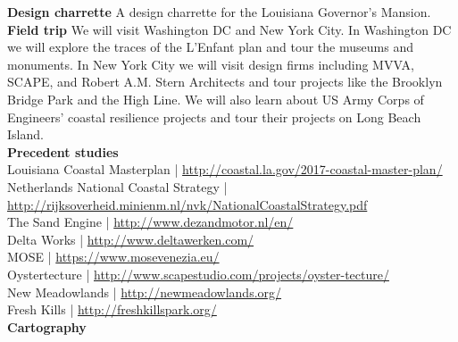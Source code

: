 \documentclass[11pt,article,oneside]{memoir}
\begin{document}
\renewcommand*{\bibfont}{\footnotesize}

\noindent \textbf{Design charrette}
A design charrette for the Louisiana Governor's Mansion.\\

\noindent \textbf{Field trip}
We will visit Washington DC and New York City. 
In Washington DC we will explore the traces of the L'Enfant plan
and tour the museums and monuments.
In New York City we will visit design firms including 
MVVA, SCAPE, and Robert A.M. Stern Architects  
and tour projects like the Brooklyn Bridge Park and the High Line.
We will also learn about 
US Army Corps of Engineers' coastal resilience projects
and tour their projects on Long Beach Island.\\



\noindent \textbf{Precedent studies}\\
%
Louisiana Coastal Masterplan | \url{http://coastal.la.gov/2017-coastal-master-plan/}\\
Netherlands National Coastal Strategy | \\
\url{http://rijksoverheid.minienm.nl/nvk/NationalCoastalStrategy.pdf}\\
The Sand Engine | \url{http://www.dezandmotor.nl/en/}\\
Delta Works | \url{http://www.deltawerken.com/}\\
MOSE | \url{https://www.mosevenezia.eu/}\\
Oystertecture | \url{http://www.scapestudio.com/projects/oyster-tecture/}\\
New Meadowlands | \url{http://newmeadowlands.org/}\\
Fresh Kills | \url{http://freshkillspark.org/}\\


\noindent \textbf{Cartography}
%
\\
\end{document}
